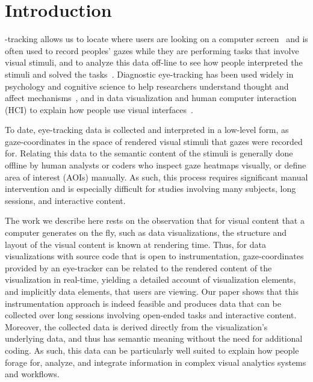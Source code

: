 \section{Introduction}

-tracking allows us to locate where users are looking on a computer screen~\cite{ware1987evaluation,jacob1991use} and is often used to record peoples' gazes while they are performing tasks that involve visual stimuli, and to analyze this data off-line to see how people interpreted the stimuli and solved the tasks~\cite{duchowski2007eye}. Diagnostic eye-tracking has been used widely in psychology and cognitive science to help researchers understand thought and affect mechanisms~\cite{rayner1995eye}, and in data visualization and human computer interaction (HCI) to explain how people use visual interfaces~\cite{duchowski2007eye}. 

To date, eye-tracking data is collected and interpreted in a low-level form, as gaze-coordinates in the space of rendered visual stimuli that gazes were recorded for. Relating this data to the semantic content of the stimuli is generally done offline by human analysts or coders who inspect gaze heatmaps visually, or define area of interest (AOIs) manually. As such, this process requires significant manual intervention and is especially difficult for studies involving many subjects, long sessions, and interactive content.

The work we describe here rests on the observation that for visual content that a computer generates on the fly, such as data visualizations, the structure and layout of the visual content is known at rendering time. Thus, for data visualizations with source code that is open to instrumentation, gaze-coordinates provided by an eye-tracker can be related to the rendered content of the visualization in real-time, yielding a detailed account of visualization elements, and implicitly data elements, that users are viewing. Our paper shows that this instrumentation approach is indeed feasible and produces data that can be collected over long sessions involving open-ended tasks and interactive content. Moreover, the collected data is derived directly from the visualization's underlying data, and thus has semantic meaning without the need for additional coding. As such, this data can be particularly well suited to explain how people forage for, analyze, and integrate information in complex visual analytics systems and workflows. 

